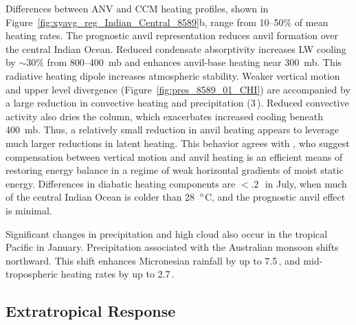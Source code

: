 \documentclass[twoside,agupp]{aguplus}
\begin{document}
Differences between ANV and CCM heating profiles, shown in
Figure~\ref{fig:xyavg_reg_Indian_Central_8589}b, range from 10--50\%
of mean heating rates.
The prognostic anvil representation reduces anvil formation over the
central Indian Ocean.
Reduced condensate absorptivity increases LW cooling by $\sim 30\%$
from 800--400~mb and enhances anvil-base heating near 300~mb. 
This radiative heating dipole increases atmospheric stability.
Weaker vertical motion and upper level divergence
(Figure~\ref{fig:pres_8589_01_CHI}) are accompanied by a large
reduction in convective heating and precipitation (3\,\mmxday).
Reduced convective activity also dries the column, which exacerbates
increased cooling beneath 400~mb.
Thus, a relatively small reduction in anvil heating appears to
leverage much larger reductions in latent heating.
This behavior agrees with \cite{SRB94}, who suggest compensation
between vertical motion and anvil heating is an efficient means of
restoring energy balance in a regime of weak horizontal gradients of
moist static energy. 
Differences in diabatic heating components are $< .2$\,\kxday\ in July,
when much of the central Indian Ocean is colder than 28~$^{\circ}$C, 
and the prognostic anvil effect is minimal.

Significant changes in precipitation and high cloud also occur in the
tropical Pacific in January.
Precipitation associated with the Australian monsoon shifts northward.
This shift enhances Micronesian rainfall by up to 7.5\,\mmxday, and 
mid-tropospheric heating rates by up to 2.7\,\kxday. 

\subsection{Extratropical Response}\label{sec:phi}
\end{document}
